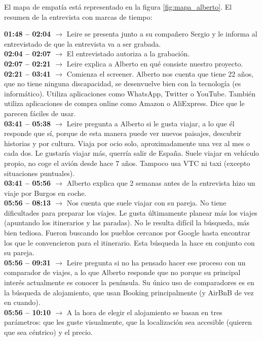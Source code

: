 El mapa de empatía está representado en la figura \ref{fig:mapa_alberto}. El resumen de la entrevista con marcas de tiempo:

\noindent\textbf{01:48 -- 02:04 $\rightarrow$} Leire se presenta junto a su compañero Sergio y le informa al entrevistado de que la entrevista va a ser grabada. \\
\textbf{02:04 -- 02:07 $\rightarrow$} El entrevistado autoriza a la grabación. \\
\textbf{02:07 -- 02:21 $\rightarrow$} Leire explica a Alberto en qué consiste nuestro proyecto. \\
\textbf{02:21 -- 03:41 $\rightarrow$} Comienza el screener. Alberto nos cuenta que tiene 22 años, que no tiene ninguna discapacidad, se desenvuelve bien con la tecnología (es informático). 
Utiliza aplicaciones como WhatsApp, Twitter o YouTube. También utiliza aplicaciones de compra online como Amazon o AliExpress. Dice que le parecen 
fáciles de usar. \\
\textbf{03:41 -- 05:38 $\rightarrow$} Leire pregunta a Alberto si le gusta viajar, a lo que él responde que sí, porque de esta manera puede ver nuevos 
paisajes, descubrir historias y por cultura. Viaja por ocio solo, aproximadamente una vez al mes o cada dos. Le gustaría viajar más, querría salir de España. 
Suele viajar en vehículo propio, no coge el avión desde hace 7 años. Tampoco usa VTC ni taxi (excepto situaciones puntuales). \\
\textbf{03:41 -- 05:56 $\rightarrow$} Alberto explica que 2 semanas antes de la entrevista hizo un viaje por Burgos en coche. \\
\textbf{05:56 -- 08:13 $\rightarrow$} Nos cuenta que suele viajar con su pareja. No tiene dificultades para preparar los viajes. Le gusta últimamente 
planear más los viajes (apuntando los itinerarios y las paradas). No le resulta difícil la búsqueda, más bien tediosa. Fueron buscando los pueblos 
cercanos por Google hasta encontrar los que le convencieron para el itinerario. Esta búsqueda la hace en conjunto con su pareja. \\
\textbf{05:56 -- 09:31 $\rightarrow$} Leire pregunta si no ha pensado hacer ese proceso con un comparador de viajes, a lo que Alberto responde que no 
porque su principal interés actualmente es conocer la península. Su único uso de comparadores es en la búsqueda de alojamiento, que usan Booking 
principalmente (y AirBnB de vez en cuando). \\
\textbf{05:56 -- 10:10 $\rightarrow$} A la hora de elegir el alojamiento se basan en tres parámetros: que les guste visualmente, que la localización sea accesible (quieren que sea céntrico) y el precio. \\
